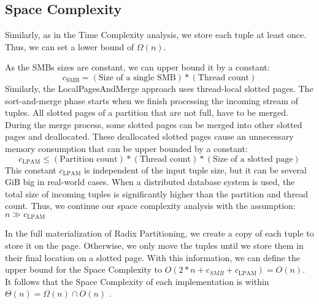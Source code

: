 \subsection{Space Complexity}\label{section-space-complexity}
Similarly, as in the Time Complexity analysis, we store each tuple at least once.
Thus, we can set a lower bound of $\Omega(n)$.

As the \acfp{SMB} sizes are constant, we can upper bound it by a constant:
\begin{equation}
  c_\textrm{SMB} = (\textrm{Size of a single SMB}) * (\textrm{Thread count})
\end{equation}
Similarly, the LocalPagesAndMerge approach uses thread-local slotted pages.
The sort-and-merge phase starts when we finish processing the incoming stream of tuples.
All slotted pages of a partition that are not full, have to be merged.
During the merge process, some slotted pages can be merged into other slotted pages and deallocated.
These deallocated slotted pages cause an unnecessary memory consumption that can be upper bounded by a constant:
\begin{equation}
  c_\textrm{LPAM} \leq (\textrm{Partition count}) * (\textrm{Thread count}) * (\textrm{Size of a slotted page})
\end{equation}
This constant $c_\textrm{LPAM}$ is independent of the input tuple size, but it can be several GiB big in real-world cases.
When a distributed database system is used, the total size of incoming tuples is significantly higher than the partition and thread count.
Thus, we continue our space complexity analysis with the assumption: $n \gg c_\textrm{LPAM} $

In the full materialization of Radix Partitioning, we create a copy of each tuple to store it on the page.
Otherwise, we only move the tuples until we store them in their final location on a slotted page.
With this information, we can define the upper bound for the Space Complexity to $O(2 * n + c_{SMB} + c_\textrm{LPAM}) = O(n)$.
It follows that the Space Complexity of each implementation is within $\Theta(n) = \Omega(n) \cap O(n) $ .
